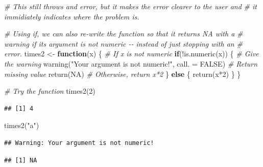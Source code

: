\documentclass[
]{book}
\newenvironment{Shaded}{\begin{snugshade}}{\end{snugshade}}
\newcommand{\AttributeTok}[1]{\textcolor[rgb]{0.77,0.63,0.00}{#1}}
\newcommand{\CommentTok}[1]{\textcolor[rgb]{0.56,0.35,0.01}{\textit{#1}}}
\newcommand{\ConstantTok}[1]{\textcolor[rgb]{0.00,0.00,0.00}{#1}}
\newcommand{\ControlFlowTok}[1]{\textcolor[rgb]{0.13,0.29,0.53}{\textbf{#1}}}
\newcommand{\DecValTok}[1]{\textcolor[rgb]{0.00,0.00,0.81}{#1}}
\newcommand{\FunctionTok}[1]{\textcolor[rgb]{0.00,0.00,0.00}{#1}}
\newcommand{\NormalTok}[1]{#1}
\newcommand{\OtherTok}[1]{\textcolor[rgb]{0.56,0.35,0.01}{#1}}
\newcommand{\SpecialCharTok}[1]{\textcolor[rgb]{0.00,0.00,0.00}{#1}}
\newcommand{\StringTok}[1]{\textcolor[rgb]{0.31,0.60,0.02}{#1}}
\begin{document}
\begin{Shaded}
\begin{Highlighting}[]
\CommentTok{\# This still throws and error, but it makes the error clearer to the user and }
\CommentTok{\# it immidiately indicates where the problem is.}

\CommentTok{\# Using if, we can also re{-}write the function so that it returns NA with a}
\CommentTok{\# warning if its argument is not numeric {-}{-} instead of just stopping with an}
\CommentTok{\# error.}
\NormalTok{times2 }\OtherTok{\textless{}{-}} \ControlFlowTok{function}\NormalTok{(x) \{}
  \CommentTok{\# If x is not numeric}
  \ControlFlowTok{if}\NormalTok{(}\SpecialCharTok{!}\FunctionTok{is.numeric}\NormalTok{(x)) \{}
    \CommentTok{\# Give the warning}
    \FunctionTok{warning}\NormalTok{(}\StringTok{"Your argument is not numeric!"}\NormalTok{, }\AttributeTok{call. =} \ConstantTok{FALSE}\NormalTok{)}
    \CommentTok{\# Return missing value}
    \FunctionTok{return}\NormalTok{(}\ConstantTok{NA}\NormalTok{)}
    \CommentTok{\# Otherwise, return x*2}
\NormalTok{  \} }\ControlFlowTok{else}\NormalTok{ \{}
    \FunctionTok{return}\NormalTok{(x}\SpecialCharTok{*}\DecValTok{2}\NormalTok{)}
\NormalTok{  \}}
\NormalTok{\}}

\CommentTok{\# Try the function}
\FunctionTok{times2}\NormalTok{(}\DecValTok{2}\NormalTok{)}
\end{Highlighting}
\end{Shaded}

\begin{verbatim}
## [1] 4
\end{verbatim}

\begin{Shaded}
\begin{Highlighting}[]
\FunctionTok{times2}\NormalTok{(}\StringTok{"a"}\NormalTok{)}
\end{Highlighting}
\end{Shaded}

\begin{verbatim}
## Warning: Your argument is not numeric!
\end{verbatim}

\begin{verbatim}
## [1] NA
\end{verbatim}
\end{document}
